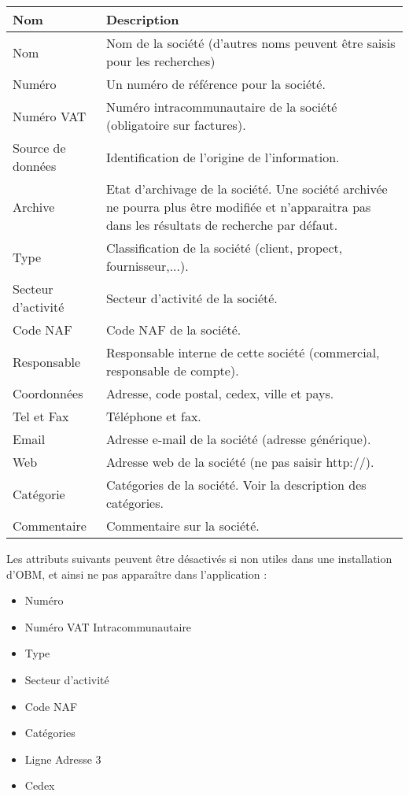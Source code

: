 \begin{tabular}{|p{3cm}|p{10cm}|}
\hline
\textbf{Nom} & \textbf{Description} \\
\hline
Nom & Nom de la société (d'autres noms peuvent être saisis pour les recherches)\\
\hline
Numéro & Un numéro de référence pour la société.\\
\hline
Numéro VAT & Numéro intracommunautaire de la société (obligatoire sur factures).\\
\hline
Source de données & Identification de l'origine de l'information.\\
\hline
Archive & Etat d'archivage de la société. Une société archivée ne pourra plus être modifiée 
et n'apparaitra pas dans les résultats de recherche par défaut.\\
\hline
Type & Classification de la société (client, propect, fournisseur,...).\\
\hline
Secteur d'activité & Secteur d'activité de la société.\\
\hline
Code NAF & Code NAF de la société.\\
\hline
Responsable & Responsable interne de cette société (commercial, responsable de compte).\\
\hline
Coordonnées & Adresse, code postal, cedex, ville et pays.\\
\hline
Tel et Fax & Téléphone et fax.\\
\hline
Email & Adresse e-mail de la société (adresse générique).\\
\hline
Web & Adresse web de la société (ne pas saisir http://).\\
\hline
Catégorie & Catégories de la société. Voir la description des catégories.\\
\hline
Commentaire & Commentaire sur la société.\\
\hline
\end{tabular}
\vspace{0.3cm}


Les attributs suivants peuvent être désactivés si non utiles dans une installation d'OBM, et ainsi ne pas apparaître dans l'application :

\begin{itemize}
\item Numéro
\item Numéro VAT Intracommunautaire
\item Type
\item Secteur d'activité
\item Code NAF
\item Catégories
\item Ligne Adresse 3
\item Cedex
\end{itemize}


